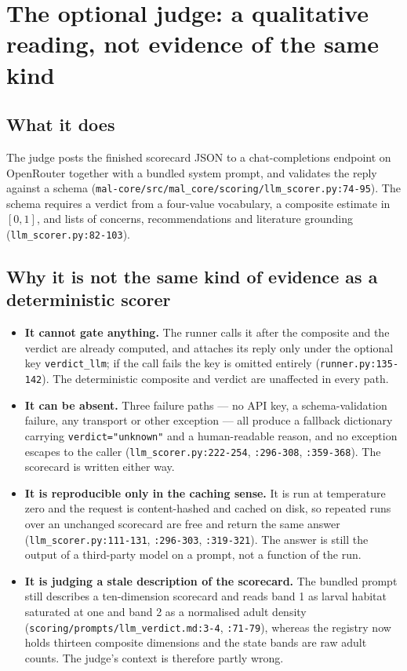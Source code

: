 \documentclass[11pt,a4paper]{article}
\newcommand{\code}[1]{\texttt{#1}}
\begin{document}
\section{The optional judge: a qualitative reading, not evidence of the same
kind}

\subsection{What it does}

The judge posts the finished scorecard JSON to a chat-completions endpoint
on OpenRouter together with a bundled system prompt, and validates the
reply against a schema (\code{mal-core/src/mal\_core/scoring/llm\_scorer.py:74-95}).
The schema requires a verdict from a four-value vocabulary, a composite
estimate in $[0,1]$, and lists of concerns, recommendations and literature
grounding (\code{llm\_scorer.py:82-103}).

\subsection{Why it is not the same kind of evidence as a deterministic scorer}

\begin{itemize}
\item \textbf{It cannot gate anything.} The runner calls it after the
      composite and the verdict are already computed, and attaches its reply
      only under the optional key \code{verdict\_llm}; if the call fails the
      key is omitted entirely (\code{runner.py:135-142}). The deterministic
      composite and verdict are unaffected in every path.
\item \textbf{It can be absent.} Three failure paths --- no API key, a
      schema-validation failure, any transport or other exception --- all
      produce a fallback dictionary carrying \code{verdict="unknown"} and a
      human-readable reason, and no exception escapes to the caller
      (\code{llm\_scorer.py:222-254}, \code{:296-308}, \code{:359-368}). The
      scorecard is written either way.
\item \textbf{It is reproducible only in the caching sense.} It is run at
      temperature zero and the request is content-hashed and cached on disk,
      so repeated runs over an unchanged scorecard are free and return the
      same answer (\code{llm\_scorer.py:111-131}, \code{:296-303},
      \code{:319-321}). The answer is still the output of a third-party
      model on a prompt, not a function of the run.
\item \textbf{It is judging a stale description of the scorecard.} The
      bundled prompt still describes a ten-dimension scorecard and reads
      band 1 as larval habitat saturated at one and band 2 as a normalised
      adult density (\code{scoring/prompts/llm\_verdict.md:3-4},
      \code{:71-79}), whereas the registry now holds thirteen composite
      dimensions and the state bands are raw adult counts. The judge's
      context is therefore partly wrong.
\end{itemize}
\end{document}
